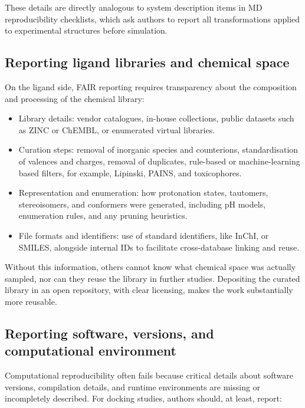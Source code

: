 \documentclass[12pt]{article}
\begin{document}
These details are directly analogous to system description items in MD reproducibility checklists, which ask authors to report all transformations applied to experimental structures before simulation\cite{CH12_mdChecklist2023}.

\subsection{Reporting ligand libraries and chemical space}

On the ligand side, FAIR reporting requires transparency about the composition and processing of the chemical library:

\begin{itemize}
  \item Library details: vendor catalogues, in-house collections, public datasets such as ZINC or ChEMBL, or enumerated virtual libraries.
  \item Curation steps: removal of inorganic species and counterions, standardisation of valences and charges, removal of duplicates, rule-based or machine-learning based filters, for example, Lipinski, PAINS, and toxicophores.
  \item Representation and enumeration: how protonation states, tautomers, stereoisomers, and conformers were generated, including pH models, enumeration rules, and any pruning heuristics.
  \item File formats and identifiers: use of standard identifiers, like InChI, or SMILES, alongside internal IDs to facilitate cross-database linking and reuse.
\end{itemize}

Without this information, others cannot know what chemical space was actually sampled, nor can they reuse the library in further studies. Depositing the curated library in an open repository, with clear licensing, makes the work substantially more reusable\cite{CH12_uTexasRepos,CH12_aguRepos,CH12_snsfRepos}.

\subsection{Reporting software, versions, and computational environment}

Computational reproducibility often fails because critical details about software versions, compilation details, and runtime environments are missing or incompletely described\cite{CH12_toolsRepro2016,CH12_reproWorkflows2017}. For docking studies, authors should, at least, report:
\end{document}
